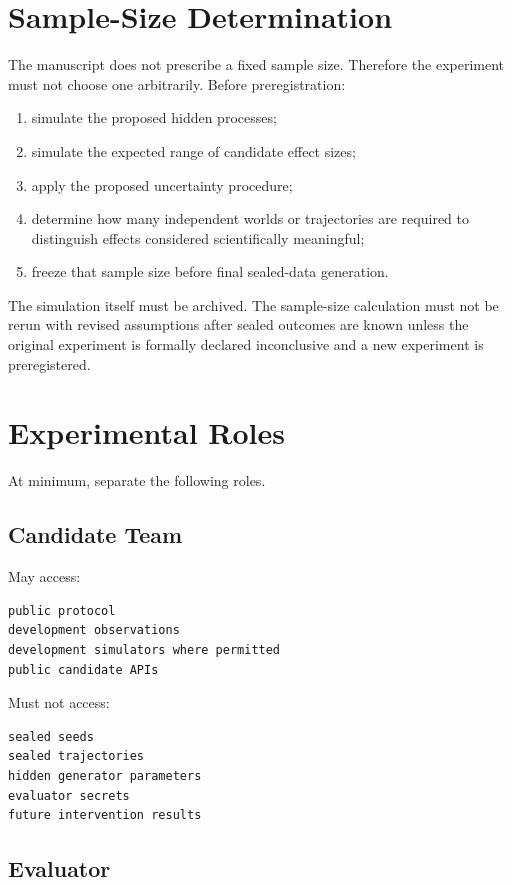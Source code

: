 \documentclass[11pt]{article}
\begin{document}
\section{Sample-Size Determination}

The manuscript does not prescribe a fixed sample size. Therefore the experiment must not choose one arbitrarily. Before preregistration:

\begin{enumerate}
\item simulate the proposed hidden processes;
\item simulate the expected range of candidate effect sizes;
\item apply the proposed uncertainty procedure;
\item determine how many independent worlds or trajectories are required to distinguish effects considered scientifically meaningful;
\item freeze that sample size before final sealed-data generation.
\end{enumerate}

The simulation itself must be archived. The sample-size calculation must not be rerun with revised assumptions after sealed outcomes are known unless the original experiment is formally declared inconclusive and a new experiment is preregistered.

\section{Experimental Roles}

At minimum, separate the following roles.

\subsection{Candidate Team}

May access:
\begin{verbatim}
public protocol
development observations
development simulators where permitted
public candidate APIs
\end{verbatim}
Must not access:
\begin{verbatim}
sealed seeds
sealed trajectories
hidden generator parameters
evaluator secrets
future intervention results
\end{verbatim}

\subsection{Evaluator}
\end{document}
